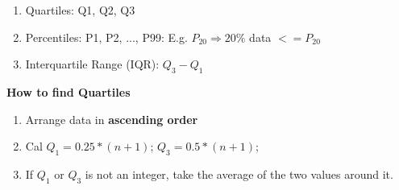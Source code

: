 \documentclass[12pt,a4paper]{article}
\begin{document}
\begin{enumerate}
    \item Quartiles: Q1, Q2, Q3
    \item Percentiles: P1, P2, ..., P99: E.g. $P_{20} \Rightarrow 20\%$ data $<= P_{20}$
    \item Interquartile Range (IQR): $Q_3 - Q_1$
\end{enumerate}

\textbf{How to find Quartiles}

\begin{enumerate}
    \item Arrange data in \textbf{ascending order}
    \item Cal $Q_1 = 0.25 * (n + 1)$; $Q_3 = 0.5 * (n + 1)$;
    \item If $Q_1$ or $Q_3$ is not an integer, take the average of the two values around it.
\end{enumerate}
\end{document}
